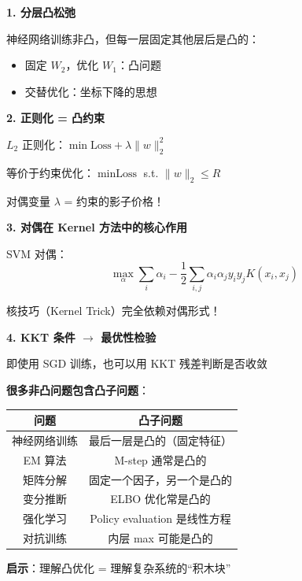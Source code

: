 \documentclass[12pt, a4paper]{ctexart}
\begin{document}
\begin{blackboard}[凸优化思想在深度学习中的应用]

\textbf{1. 分层凸松弛}

神经网络训练非凸，但每一层固定其他层后是凸的：
\begin{itemize}
    \item 固定 $W_2$，优化 $W_1$：凸问题
    \item 交替优化：坐标下降的思想
\end{itemize}

\textbf{2. 正则化 = 凸约束}

$L_2$ 正则化：$\min \text{Loss} + \lambda \|w\|_2^2$

等价于约束优化：$\min \text{Loss}$ s.t. $\|w\|_2 \leq R$

对偶变量 $\lambda$ = 约束的影子价格！

\textbf{3. 对偶在 Kernel 方法中的核心作用}

SVM 对偶：
\[
\max_\alpha \sum_i \alpha_i - \frac{1}{2} \sum_{i,j} \alpha_i \alpha_j y_i y_j K(x_i, x_j)
\]

核技巧（Kernel Trick）完全依赖对偶形式！

\textbf{4. KKT 条件 $\to$ 最优性检验}

即使用 SGD 训练，也可以用 KKT 残差判断是否收敛

\end{blackboard}

\begin{blackboard}[现代机器学习中的凸子问题]

\textbf{很多非凸问题包含凸子问题}：

\begin{center}
\begin{tabular}{c|c}
\textbf{问题} & \textbf{凸子问题} \\
\hline
神经网络训练 & 最后一层是凸的（固定特征） \\
EM 算法 & M-step 通常是凸的 \\
矩阵分解 & 固定一个因子，另一个是凸的 \\
变分推断 & ELBO 优化常是凸的 \\
强化学习 & Policy evaluation 是线性方程 \\
对抗训练 & 内层 max 可能是凸的
\end{tabular}
\end{center}

\textbf{启示}：理解凸优化 = 理解复杂系统的``积木块''

\end{blackboard}
\end{document}
